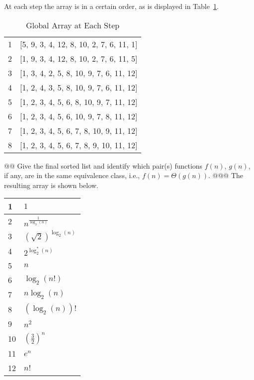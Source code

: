 \documentclass[10pt]{article}
\begin{document}
\begin{easylist}[enumerate]
        At each step the array is in a certain order, as is displayed in Table~\ref{table:order}.

        \begin{table}[ht]
            \centering
            \begin{tabular}{| l | l |}
                \hline
                1 & [5, 9, 3, 4, 12, 8, 10, 2, 7, 6, 11, 1]\\
                2 & [1, 9, 3, 4, 12, 8, 10, 2, 7, 6, 11, 5]\\
                3 & [1, 3, 4, 2, 5, 8, 10, 9, 7, 6, 11, 12]\\
                4 & [1, 2, 4, 3, 5, 8, 10, 9, 7, 6, 11, 12]\\
                5 & [1, 2, 3, 4, 5, 6, 8, 10, 9, 7, 11, 12]\\
                6 & [1, 2, 3, 4, 5, 6, 10, 9, 7, 8, 11, 12]\\
                7 & [1, 2, 3, 4, 5, 6, 7, 8, 10, 9, 11, 12]\\
                8 & [1, 2, 3, 4, 5, 6, 7, 8, 9, 10, 11, 12]\\
                \hline
            \end{tabular}
            \caption{Global Array at Each Step}
            \label{table:order}
        \end{table}

    \newpage
    @@ Give the final sorted list and identify which pair(s) functions $f(n)$, $g(n)$, if any, are in the same equivalence class, i.e., $f(n) = \Theta(g(n))$.
    @@@ The resulting array is shown below.

    \begin{center}
        \begin{tabular}{|l|l|}
            \hline
            1 & $1$\\
            \hline
            2 & $n^{\frac{1}{\log_2(n)}}$\\
            \hline
            3 & ${\left( \sqrt{2} \right)}^{\log_2(n)}$\\
            \hline
            4 & $2^{\log^*_2(n)}$\\
            \hline
            5 & $n$\\
            \hline
            6 & $\log_2(n!)$\\
            \hline
            7 & $n \log_2(n)$\\
            \hline
            8 & $(\log_2(n))!$\\
            \hline
            9 & $n^2$\\
            \hline
            10 & ${ \left( \frac{3}{2} \right) }^n$\\
            \hline
            11 & $e^n$\\
            \hline
            12 & $n!$\\
            \hline
        \end{tabular}
    \end{center}


\end{easylist}
\end{document}
